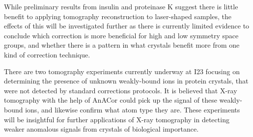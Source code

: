 While preliminary results from insulin and proteinase K suggest there is little benefit to applying tomography reconstruction to laser-shaped samples, the effects of this will be investigated further as there is currently limited evidence to conclude which correction is more beneficial for high and low symmetry space groups, and whether there is a pattern in what crystals benefit more from one kind of correction technique.

There are two tomography experiments currently underway at I23 focusing on determining the presence of unknown weakly-bound ions in protein crystals, that were not detected by standard corrections protocols. It is believed that X-ray tomography with the help of AnACor could pick up the signal of these weakly-bound ions, and likewise confirm what atom type they are. These experiments will be insightful for further applications of X-ray tomography in detecting weaker anomalous signals from crystals of biological importance.

